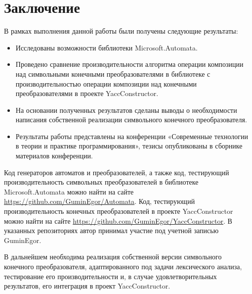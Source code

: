 \section*{Заключение}
В рамках выполнения данной работы были получены следующие результаты:

\begin{itemize}
\item Исследованы возможности библиотеки Microsoft.Automata.
\item Проведено сравнение производительности алгоритма операции композиции над символьными конечными преобразователями в библиотеке с производительностью операции композиции над конечными преобразователями в проекте YaccConstructor.
\item На основании полученных результатов сделаны выводы о необходимости написания собственной реализации символьного конечного преобразователя.
\item Результаты работы представлены на конференции «Современные технологии в теории и практике программирования», тезисы опубликованы в сборнике материалов конференции.
\end{itemize}

Код генераторов автоматов и преобразователей, а также код, тестирующий производительность символьных преобразователей в библиотеке Microsoft.Automata можно найти на сайте \url{https://github.com/GuminEgor/Automata}. Код, тестирующий производительность конечных преобразователей в проекте  YaccConstructor можно найти на сайте \url{https://github.com/GuminEgor/YaccConstructor}. В указанных репозиториях автор принимал участие под учетной записью GuminEgor.

В дальнейшем необходима реализация собственной версии символьного конечного преобразователя, адаптированного под задачи лексического анализа, тестирование его производительности и, в случае удовлетворительных результатов, его интеграция в проект YaccConstructor.

